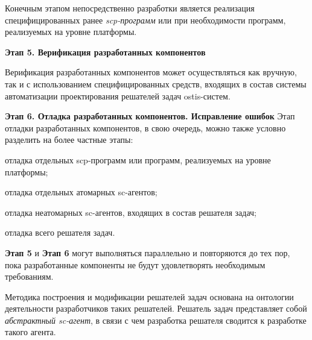 Конечным этапом непосредственно разработки является реализация специфицированных ранее \textit{scp-программ} или при необходимости программ, реализуемых на уровне платформы.

\textbf{Этап 5. Верификация разработанных компонентов}

Верификация разработанных компонентов может осуществляться как вручную, так и с использованием специфицированных средств, входящих в состав системы автоматизации проектирования решателей задач ostis-систем.

\textbf{Этап 6. Отладка разработанных компонентов. Исправление ошибок}
Этап отладки разработанных компонентов, в свою очередь, можно также условно разделить на более частные этапы:

\begin{textitemize}
    \item отладка отдельных scp-программ или программ, реализуемых на уровне платформы;
    \item отладка отдельных атомарных sc-агентов;
    \item отладка неатомарных sc-агентов, входящих в состав решателя задач;
    \item отладка всего решателя задач.
\end{textitemize}

\textbf{Этап 5} и \textbf{Этап 6} могут выполняться параллельно и повторяются до тех пор, пока разработанные компоненты не будут удовлетворять необходимым требованиям.

Методика построения и модификации решателей задач основана на онтологии деятельности разработчиков таких решателей.
Решатель задач представляет собой \textit{абстрактный sc-агент}, в связи с чем разработка решателя сводится к разработке такого агента.

